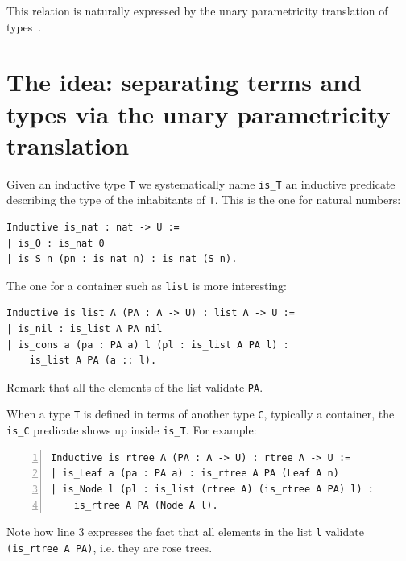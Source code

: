 \documentclass[sigplan,10pt,review]{acmart}\settopmatter{printfolios=true,printccs=false,printacmref=false}
\begin{document}
This relation is naturally expressed by the unary parametricity
translation of types~\cite{Wadler:1989:TF:99370.99404}.

\section{The idea: separating terms and types via the unary parametricity translation}
\label{sec:idea}

Given an inductive type \lstinline+T+ we systematically name \lstinline+is_T+
an inductive predicate describing the type of the inhabitants of
\lstinline+T+. This is the one for natural numbers:

\begin{minipage}{\textwidth}\begin{lstlisting}
Inductive is_nat : nat -> U :=
| is_O : is_nat 0
| is_S n (pn : is_nat n) : is_nat (S n).
\end{lstlisting}\end{minipage}

\noindent
The one for a container such as \lstinline+list+ is more interesting:

\begin{minipage}{\textwidth}\begin{lstlisting}
Inductive is_list A (PA : A -> U) : list A -> U :=
| is_nil : is_list A PA nil
| is_cons a (pa : PA a) l (pl : is_list A PA l) :
    is_list A PA (a :: l).
\end{lstlisting}\end{minipage}

\noindent
Remark that all the elements of the list validate \lstinline+PA+.

When a type \lstinline+T+ is defined in terms of another type
\lstinline+C+, typically a container, the \lstinline+is_C+ predicate
shows up inside \lstinline+is_T+. For example:

\begin{minipage}{\textwidth}\begin{lstlisting}[numbers=left]
Inductive is_rtree A (PA : A -> U) : rtree A -> U :=
| is_Leaf a (pa : PA a) : is_rtree A PA (Leaf A n)
| is_Node l (pl : is_list (rtree A) (is_rtree A PA) l) :
    is_rtree A PA (Node A l).
\end{lstlisting}\end{minipage}

\noindent
Note how line 3 expresses the fact that all elements in the list
\lstinline+l+ validate \lstinline+(is_rtree A PA)+, i.e. they are
rose trees.
\end{document}

